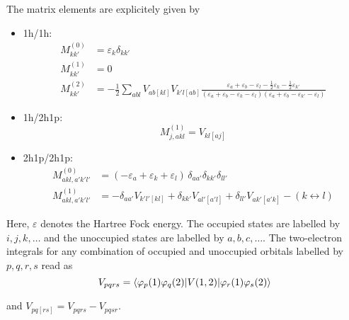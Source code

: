 The matrix elements are explicitely given by
\begin{itemize}
 \item 1h/1h:
   \begin{align}
    M_{kk'}^{(0)} &= \varepsilon_k \delta_{kk'} \\
    M_{kk'}^{(1)} &= 0 \\
    M_{kk'}^{(2)} &= -\frac12 \sum\limits_{abl} V_{ab[kl]} V_{k'l[ab]} %
                     \frac{\varepsilon_a+\varepsilon_b-\varepsilon_l
                       -\frac12 \varepsilon_k-\frac12 \varepsilon_{k'}}
                     {(\varepsilon_a+\varepsilon_b-\varepsilon_k-\varepsilon_l)
                      (\varepsilon_a+\varepsilon_b-\varepsilon_{k'}-\varepsilon_l)}
   \end{align}
 \item 1h/2h1p:
   \begin{equation}
    M_{j,akl}^{(1)} = V_{kl[aj]}
   \end{equation}
 \item 2h1p/2h1p:
   \begin{align}
    M_{akl,a'k'l'}^{(0)} &= (-\varepsilon_a+\varepsilon_k+\varepsilon_l)
                             \, \delta_{aa'}\delta_{kk'}\delta_{ll'} \\
    M_{akl,a'k'l'}^{(1)} &= -\delta_{aa'} V_{k'l'[kl]} + \delta_{kk'} V_{al'[a'l]}
                            +\delta_{ll'} V_{ak'[a'k]} - (k \leftrightarrow l)
   \end{align}
\end{itemize}

Here, $\varepsilon$ denotes the Hartree Fock energy. The occupied states are labelled
by $i,j,k,\dots$ and the unoccupied states are labelled by $a,b,c,\dots$. The
two-electron integrals for any combination of occupied and unoccupied orbitals
labelled by $p,q,r,s$ read as
\begin{equation}
 V_{pqrs} = \braket{\varphi_p(1)\varphi_q(2) |V(1,2)| \varphi_r(1)\varphi_s(2)}
\end{equation}

and $V_{pq[rs]} = V_{pqrs} - V_{pqsr}$.


